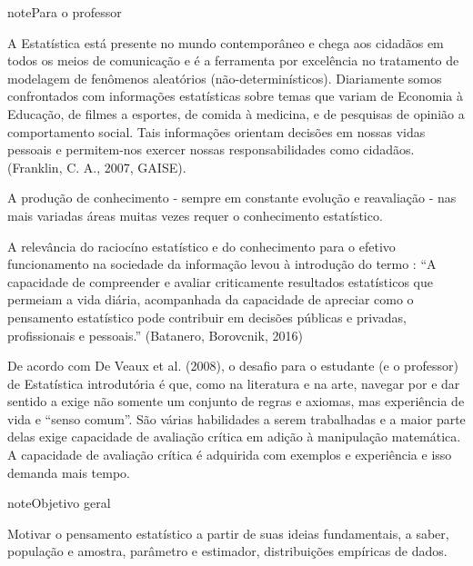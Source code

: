\begin{sphinxadmonition}{note}{Para o professor}

A Estatística está presente no mundo contemporâneo e chega aos cidadãos em todos os meios de comunicação e é a ferramenta por excelência no tratamento de modelagem de fenômenos aleatórios (não-determinísticos). Diariamente somos confrontados com informações estatísticas sobre temas que variam de Economia à Educação, de filmes a esportes, de comida à medicina, e de pesquisas de opinião a comportamento social. Tais informações orientam decisões em nossas vidas pessoais e permitem-nos exercer nossas responsabilidades como cidadãos. (Franklin, C. A., 2007, GAISE).

A produção de conhecimento - sempre em constante evolução e reavaliação - nas mais variadas áreas muitas vezes requer o conhecimento estatístico.

A relevância do raciocíno estatístico e do conhecimento para o efetivo funcionamento na sociedade da informação levou à introdução do termo : ``A capacidade de compreender e avaliar criticamente resultados estatísticos que permeiam a vida diária,  acompanhada da capacidade de apreciar como o pensamento estatístico pode contribuir em decisões públicas e privadas, profissionais e pessoais.'' (Batanero, Borovcnik, 2016)

De acordo com De Veaux et al. (2008), o desafio para o estudante (e o professor) de Estatística introdutória é que, como na literatura e na arte, navegar por e dar sentido a exige não somente um conjunto de regras e axiomas, mas experiência de vida e ``senso comum''. São várias habilidades a serem trabalhadas e a maior parte delas exige capacidade de avaliação crítica em adição à manipulação matemática. A capacidade de avaliação crítica é adquirida com exemplos e experiência e isso demanda mais tempo.

\begin{figure}[H]
\centering

\noindent{}
\end{figure}

\begin{sphinxadmonition}{note}{Objetivo geral}

Motivar o pensamento estatístico a partir de suas ideias fundamentais, a saber, população e amostra, parâmetro e estimador, distribuições empíricas de dados.
\end{sphinxadmonition}


\end{sphinxadmonition}
